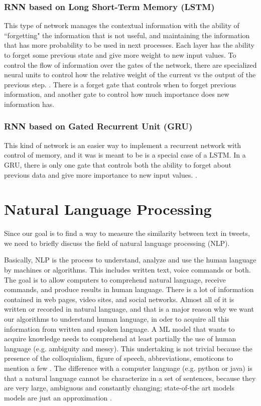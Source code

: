 \documentclass[12pt]{report}
\begin{document}
\subsubsection{RNN based on Long Short-Term Memory (LSTM) }

This type of network manages the contextual information with the ability of ``forgetting" the information that is not useful, and maintaining the information that has more probability to be used in next processes. Each layer has the ability to forget some previous state and give more weight to new input values. 
To control the flow of information over the gates of the network, there are  specialized neural units to control how the relative weight of the current
vs the output of the previous step.   \cite{Jurafsky2018}. There is a forget gate that controls when  to  forget previous information,  and another gate to control 
how  much importance does new information has.

\subsubsection{RNN based on Gated Recurrent Unit (GRU) }
This kind of network is an easier way to implement a recurrent network with control of memory, and it was  is meant to be is a special case of a \ac{LSTM}. In a GRU, there is only one gate  that controls both the ability to forget about previous data and give more importance to new input values. 
\cite{Jurafsky2018}.

\section{Natural Language Processing}
Since our goal is to find a way to measure the similarity between text in tweets, we need to briefly discuss the field of natural language processing
(\ac{NLP}). 

Basically, \ac{NLP} is the process to understand, analyze and use the human language by machines or algorithms. 
This includes  written text, voice commands or both. The goal is to allow computers to comprehend natural language, receive 
commands, and produce results in human language. There is a lot of information contained in web pages, video sites, and social networks.   
Almost all of it is
written or recorded in natural language, and that is a major  reason why we want our algorithms to understand human language, in  oder   to acquire 
all this information from written and spoken language. A \ac{ML} model that wants to acquire knowledge needs to comprehend at least partially the  use of human language  (e.g. ambiguity and messy). This undertaking is not trivial because the presence of the colloquialism, figure of speech, abbreviations, emoticons to mention a few \cite{Nevala2017} \cite{Russell2010}. The difference with a computer language (e.g. python or java) is that a natural language cannot be characterize in a set of sentences, because they are very large, ambiguous and constantly changing;  state-of-the art models
models are just an approximation \cite{Russell2010}.
\end{document}
